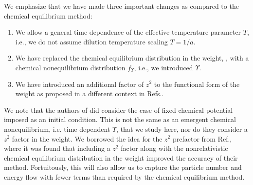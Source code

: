 We emphasize that we have made three important changes as compared to  the chemical equilibrium method:
\begin{enumerate}
\item  We allow a general time dependence of the effective temperature parameter $T$, i.e., we do not assume dilution temperature scaling $T=1/a$.
\item We have replaced the chemical  equilibrium distribution in the weight, ,  with a chemical nonequilibrium distribution  $f_\Upsilon $, i.e., we introduced $\Upsilon$.
\item We have introduced an additional factor of $z^2$ to the functional form of the weight as proposed in a different context in Refs.\cite{Wilkening,Wilkening2}. 
\end{enumerate} 
We note that the authors of \cite{Esposito:2000hi} did consider the case of fixed chemical potential imposed as an initial condition. This is not the same as an emergent chemical nonequilibrium, i.e. time dependent $\Upsilon$, that we study here, nor do they consider a $z^2$ factor in the weight. We borrowed the idea for the $z^2$ prefactor from   Ref.\cite{Wilkening2}, where it was found that including a $z^2$ factor along with the nonrelativistic chemical equilibrium distribution in the weight improved the accuracy of their method. Fortuitously,  this will also allow us to capture the particle number and energy flow with fewer terms than required by the chemical equilibrium method. 

